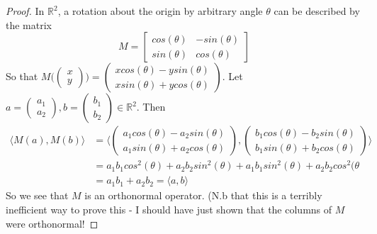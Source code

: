 \documentclass[12pt]{article}
\newenvironment{problem}[2][Problem]{\begin{trivlist}
\item[\hskip \labelsep {\bfseries #1}\hskip \labelsep {\bfseries #2.}]}{\end{trivlist}}
\theoremstyle{definition}
\theoremstyle{definition}
\theoremstyle{definition}
\theoremstyle{definition}
\begin{document}
\begin{problem}{3.9} 
\begin{proof}
In $\mathbb{R}^2$, a rotation about the origin by arbitrary angle $\theta$ can be described by the matrix 
$$
M = 
\begin{bmatrix}
cos(\theta) & - sin(\theta) \\
sin(\theta) & cos(\theta)
\end{bmatrix}
$$
So that $M\bigg(\begin{pmatrix} x \\ y \end{pmatrix}\bigg) = (\begin{smallmatrix} xcos(\theta) - ysin(\theta) \\ xsin(\theta) + ycos(\theta) \end{smallmatrix}) $.
Let $a = (\begin{smallmatrix} a_1 \\ a_2 \end{smallmatrix}), b= (\begin{smallmatrix} b_1 \\ b_2 \end{smallmatrix}) \in \mathbb{R}^2$. Then 
\begin{align*}
\langle M(a), M(b) \rangle &= \bigg\langle \begin{pmatrix} a_1cos(\theta) - a_2sin(\theta) \\ a_1sin(\theta) + a_2cos(\theta) \end{pmatrix}, \begin{pmatrix} b_1cos(\theta) - b_2sin(\theta) \\ b_1sin(\theta) + b_2cos(\theta) \end{pmatrix} \bigg\rangle \\
&= a_1b_1cos^2(\theta)+a_2b_2sin^2(\theta) + a_1b_1sin^2(\theta) + a_2b_2cos^2(\theta \\
&= a_1b_1+a_2b_2 = \langle a, b \rangle
\end{align*}
So we see that $M$ is an orthonormal operator. (N.b that this is a terribly inefficient way to prove this - I should have just shown that the columns of $M$ were orthonormal!
\end{proof}
\end{problem}
\end{document}
